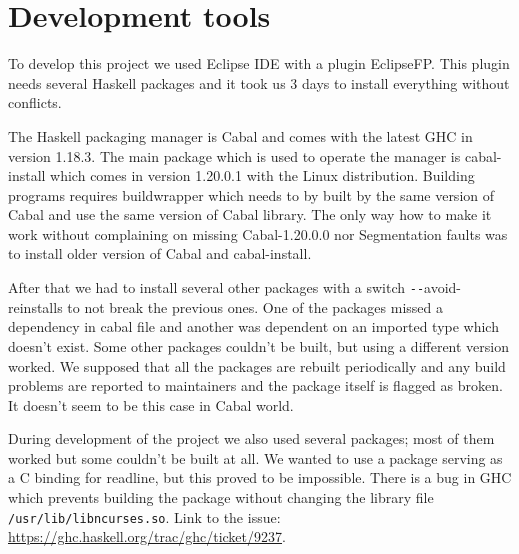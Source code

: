 \documentclass{article}
\begin{document}
\section{Development tools}

To develop this project we used Eclipse IDE with a plugin EclipseFP.
This plugin needs several Haskell packages and it took us 3 days to install everything without conflicts.

The Haskell packaging manager is Cabal and comes with the latest GHC in version 1.18.3.
The main package which is used to operate the manager is cabal-install which comes in version 1.20.0.1 with the Linux distribution.
Building programs requires buildwrapper which needs to by built by the same version of Cabal and use the same version of Cabal library.
The only way how to make it work without complaining on missing Cabal-1.20.0.0 nor Segmentation faults was to install older version of Cabal and cabal-install.

After that we had to install several other packages with a switch \texttt{-{}-}avoid-reinstalls to not break the previous ones.
One of the packages missed a dependency in cabal file and another was dependent on an imported type which doesn't exist.
Some other packages couldn't be built, but using a different version worked.
We supposed that all the packages are rebuilt periodically and any build problems are reported to maintainers and the package itself is flagged as broken.
It doesn't seem to be this case in Cabal world.

During development of the project we also used several packages; most of them worked but some couldn't be built at all.
We wanted to use a package serving as a C binding for readline, but this proved to be impossible.
There is a bug in GHC which prevents building the package without changing the library file \texttt{/usr/lib/libncurses.so}.
Link to the issue: \url{https://ghc.haskell.org/trac/ghc/ticket/9237}.
\end{document}
